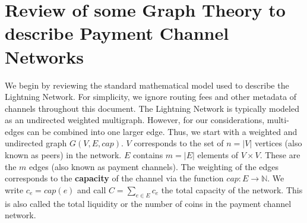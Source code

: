 \documentclass[10pt,twocolumn]{article}
\newtheorem{definition}{Definition}[section]
\begin{document}
\section{Review of some Graph Theory to describe Payment Channel Networks}


We begin by reviewing the standard mathematical model used to describe the Lightning Network.
For simplicity, we ignore routing fees and other metadata of channels throughout this document.
The Lightning Network is typically modeled as an undirected weighted multigraph.
However, for our considerations, multi-edges can be combined into one larger edge.
Thus, we start with a weighted and undirected graph \(G(V,E,cap)\).
\(V\) corresponds to the set of \(n = |V|\) vertices (also known as peers) in the network.
\(E\) contains \(m = |E|\) elements of \(V \times V\).
These are the \(m\) edges (also known as payment channels).
The weighting of the edges corresponds to the \textbf{capacity} of the channel via the function \(cap: E \longrightarrow \mathbb{N}\).
We write \(c_e = cap(e)\) and call \(C = \sum_{e \in E} c_e\) the total capacity of the network.
This is also called the total liquidity or the number of coins in the payment channel network.
\end{document}
